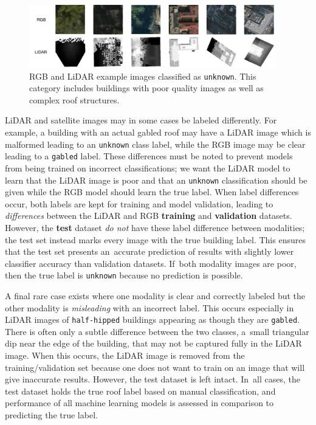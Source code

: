 \begin{figure}[H]
\centering
\includegraphics[width=0.95\textwidth]{chapter_4_roofshape/imgs/unknown_examples.pdf}
\caption[RGB and LiDAR example images classified as \texttt{unknown}]{RGB and LiDAR example images classified as \texttt{unknown}. This category includes buildings with poor quality images as well as complex roof structures.}
\label{fig:unknown_examples}
\end{figure}

LiDAR and satellite images may in some cases be labeled differently.  For example, a building with an actual gabled roof may have a LiDAR image which is malformed leading to an \texttt{unknown} class label, while the RGB image may be clear leading to a \texttt{gabled} label.  These differences must be noted to prevent models from being trained on incorrect classifications; we want the LiDAR model to learn that the LiDAR image is poor and that an \texttt{unknown} classification should be given while the RGB model should learn the true label.  When label differences occur, both labels are kept for training and model validation, leading to \emph{differences} between the LiDAR and RGB \textbf{training} and \textbf{validation} datasets. However,        the \textbf{test} dataset \emph{do not} have these label difference between modalities; the test set   instead marks every image with the true building label. This ensures that the test set presents an~accurate prediction of results with slightly lower classifier accuracy than validation datasets. If~both modality images are poor, then the true label is \texttt{unknown} because no prediction is possible. 

A final rare case exists where one modality is clear and correctly labeled but the other modality is \emph{misleading} with an incorrect label.  This  occurs especially in LiDAR images of \texttt{half-hipped} buildings appearing as though they are \texttt{gabled}. There is often only a subtle difference between the two classes, a~small triangular dip near the edge of the building, that may not be captured fully in the LiDAR image. When this occurs, the LiDAR image is removed from the training/validation set because one does not want to train on an image that will give inaccurate results.  However, the test dataset is left intact. In~all cases, the test dataset holds the true roof label based on manual classification, and performance of all machine learning models is assessed in comparison to predicting the true label. 

